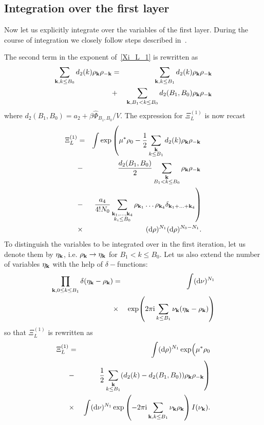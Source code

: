 \subsection{Integration over the first layer}
Now let us explicitly integrate over the variables of the first layer. During the course of integration we closely follow steps described in~\cite{MpkCMP2005}.

The second term in the exponent of~\eqref{Xi_L_1} is rewritten as
\begin{eqnarray*}
	\sum_{\substack{\vb k, k \leq B_0}} d_2(k) \rho_{\vb k} \rho_{-\vb k} 
	& = &  
	\sum_{\substack{\vb k, k \leq B_1}} d_2(k) \rho_{\vb k} \rho_{-\vb k}
	\\
	& + &
	\sum_{\substack{\vb k, B_1 < k \leq B_0}} d_2(B_1, B_0) \rho_{\vb k} \rho_{-\vb k}
\end{eqnarray*}
where $d_2(B_1, B_0) = a_2 + \beta\hat{\Phi}_{B_1, B_0}/V$.
The expression for $\Xi_L^{(1)}$ is now recast
\begin{eqnarray*}
	\Xi_L^{(1)} &=& 
	\int \exp\left(
	\mu^* \rho_0 - \frac{1}{2} \sum_{\substack{\vb k \\ k \leq B_1}} d_2(k) \rho_{\vb k} \rho_{-\vb k}
	\right.
	\\
	& - & 
	\left.
	\frac{d_2(B_1, B_0)}{2} \sum_{\substack{\vb k \\ B_1 < k \leq B_0}} \rho_{\vb k} \rho_{-\vb k}  
	\right.
	\\
	& - & \left. \frac{a_4}{4! N_0} \sum_{\substack{\vb k_1, \dotsc, \vb k_4 \\ k_i \leq B_0}} \rho_{\vb k_1} \dotsc \rho_{\vb k_4} \delta_{\vb{k}_1 + \dotsc + \vb{k}_4} \right)
	\\ 
	& \times & ({\rm d} \rho)^{N_1} ({\rm d} \rho)^{N_0 - N_1}.
\end{eqnarray*}
To distinguish the variables to be integrated over in the first iteration, let us denote them by $\eta_{\vb k}$, i.e. $\rho_{\vb k} \rightarrow \eta_{\vb k}$ for $B_1 < k \leq B_0$. Let us also extend the number of variables $\eta_{\vb k}$ with the help of $\delta-$functions:
\begin{eqnarray*}
	\prod_{\vb{k}, 0\leq k \leq B_1}\delta(\eta_{\vb k}-\rho_{\vb k})
	& = &  \int ({\rm d}\nu)^{N_1} \\
	&\times& \exp (2\pi{\rm i}\sum_{k\leq B_1}\nu_{\vb k}(\eta_{\vb k}-\rho_{\vb k}))
\end{eqnarray*}
so that $\Xi_L^{(1)}$ is rewritten as 
\begin{eqnarray*}
	\Xi_L^{(1)} &=& 
	\int ({\rm d} \rho)^{N_1} \exp 
	\Bigl(
		\mu^* \rho_0 
	\\
	& - & 
	\left.\frac{1}{2} \sum_{\substack{\vb k \\ k \leq B_1}} (d_2(k) - d_2(B_1, B_0) ) \rho_{\vb k} \rho_{-\vb k}
	\right)
	\\
	&\times&  \int ({\rm d}\nu)^{N_1} \exp \left(-2\pi{\rm i}\sum_{\vb k, k \leq B_1} \nu_{\vb k}\rho_{\vb k}\right)
	I(\nu_{\vb k}).
\end{eqnarray*}
